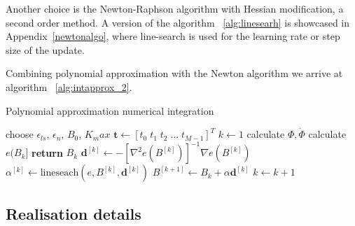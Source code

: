 \documentclass[11pt]{report}
\begin{document}
    Another choice is the Newton-Raphson algorithm with Hessian modification, a second order method.
    A version of the algorithm ~\ref{alg:linesearh} is showcased in Appendix~\ref{newtonalgo}, where line-search is used for the learning
    rate or step size of the update.

    Combining polynomial approximation with the Newton algorithm we arrive at algorithm ~\ref{alg:intapprox_2}.

    \begin{algorithm}
        \caption{Polynomial approximation numerical integration}
        \begin{algorithmic}
            \State choose $\epsilon_{ls}$, $\epsilon_{n}$, $B_0$, $K_max$
            \State $\pmb{t} \gets [t_0 \; t_1 \; t_2 \; \dots \; t_{M-1} ]^T$
            \State $k \gets 1$
            \State calculate $\Phi, \dot\Phi$
            \Repeat
                \State calculate $e(B_k]$
                    \State \textbf{return} $B_k$
                \EndIf
                \State $ \pmb{d}^{[k]} \gets -\left[ \nabla^2 e(B^{[k]}) \right]^{-1} \nabla e(B^{[k]})$
                \State $ \alpha^{[k]} \gets \text{lineseach}(e, B^{[k]}, \pmb{d}^{[k]}) $
                \State $ B^{[k+1]} \gets B_k + \alpha \pmb{d}^{[k]}$
                \State $k \gets k+1$
        \end{algorithmic}
        \label{alg:intapprox_2}
    \end{algorithm}

    \subsection{Realisation details}
\end{document}
